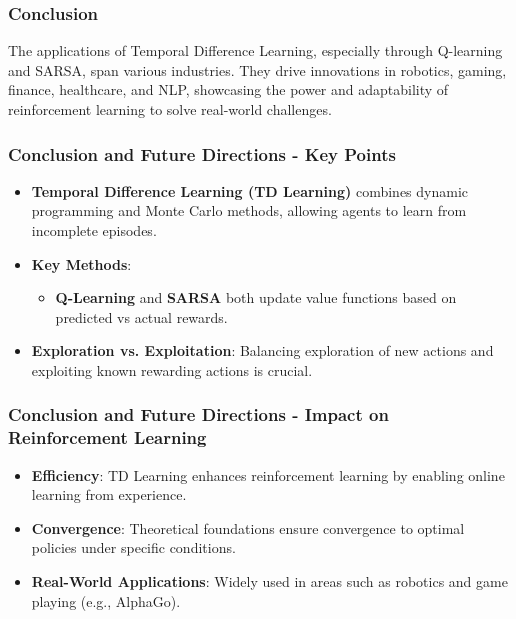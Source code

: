 \documentclass[aspectratio=169]{beamer}
\begin{document}
\begin{frame}[fragile]
    \frametitle{Conclusion}
    The applications of Temporal Difference Learning, especially through Q-learning and SARSA, span various industries. They drive innovations in robotics, gaming, finance, healthcare, and NLP, showcasing the power and adaptability of reinforcement learning to solve real-world challenges.
\end{frame}

\begin{frame}[fragile]
    \frametitle{Conclusion and Future Directions - Key Points}
    \begin{itemize}
        \item \textbf{Temporal Difference Learning (TD Learning)} combines dynamic programming and Monte Carlo methods, allowing agents to learn from incomplete episodes.
        \item \textbf{Key Methods}:
            \begin{itemize}
                \item \textbf{Q-Learning} and \textbf{SARSA} both update value functions based on predicted vs actual rewards.
            \end{itemize}
        \item \textbf{Exploration vs. Exploitation}: Balancing exploration of new actions and exploiting known rewarding actions is crucial.
    \end{itemize}
\end{frame}

\begin{frame}[fragile]
    \frametitle{Conclusion and Future Directions - Impact on Reinforcement Learning}
    \begin{itemize}
        \item \textbf{Efficiency}: TD Learning enhances reinforcement learning by enabling online learning from experience.
        \item \textbf{Convergence}: Theoretical foundations ensure convergence to optimal policies under specific conditions.
        \item \textbf{Real-World Applications}: Widely used in areas such as robotics and game playing (e.g., AlphaGo).
    \end{itemize}
\end{frame}
\end{document}
